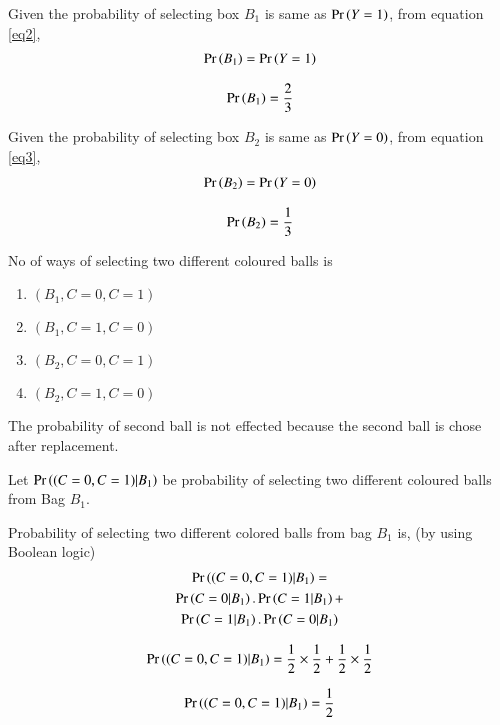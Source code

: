 \documentclass[journal,12pt,twocolumn]{IEEEtran}
\begin{document}
Given the probability of selecting box $B_1$ is same as $\Pr\left(Y=1\right)$, from equation \eqref{eq2},
\begin{align}
    \Pr\left(B_1\right)=\Pr\left(Y=1\right)
\end{align}

\begin{align}\label{eq4}
    \Pr\left(B_1\right)=\frac{2}{3}
\end{align}

Given the probability of selecting box $B_2$ is same as $\Pr\left(Y=0\right)$, from equation \eqref{eq3},
\begin{align}
    \Pr\left(B_2\right)=\Pr\left(Y=0\right)
\end{align}

\begin{align}\label{eq5}
    \Pr\left(B_2\right)=\frac{1}{3}
\end{align}

No of ways of selecting two different coloured balls is 
\begin{enumerate}[(1)]
    \item $(B_1,C=0,C=1)$
    \item $(B_1,C=1,C=0)$
    \item $(B_2,C=0,C=1)$
    \item $(B_2,C=1,C=0)$
\end{enumerate}

\vspace{0.2in}

The probability of second ball is not effected because the second ball is chose after replacement.
\vspace{0.2in}

Let $\Pr\left((C=0,C=1)|B_1\right)$ be probability of selecting two different coloured balls from Bag $B_1$.

Probability of selecting two different colored balls from bag $B_1$ is, (by using Boolean logic)
\begin{multline}
    \Pr\left((C=0,C=1)|B_1\right)=\\
    \Pr\left(C=0|B_1\right).\Pr\left(C=1|B_1\right)+\\
    \Pr\left(C=1|B_1\right).\Pr\left(C=0|B_1\right)
\end{multline}

\begin{align}
        \Pr\left((C=0,C=1)|B_1\right)=\frac{1}{2} \times\frac{1}{2}+\frac{1}{2}\times\frac{1}{2}
\end{align}

\begin{align}\label{eq6}
    \Pr\left((C=0,C=1)|B_1\right)=\frac{1}{2}
\end{align}
\end{document}
